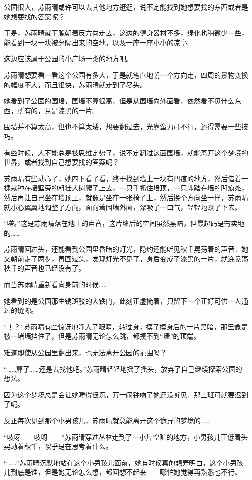 公园很大，苏雨晴或许可以去其他地方逛逛，说不定能找到她想要找的东西或者是她想要找的答案呢？

于是，苏雨晴就干脆朝着反方向走去，这边的健身器材不多，绿化也稍微少一些，能看到一块一块被分隔出来的空地，以及一座一座小小的凉亭。

这边应该属于公园的小广场一类的地方吧。

苏雨晴想要看一看这个公园有多大，于是就笔直地朝一个方向走，四周的景物变换的幅度不大，而且很快，苏雨晴就走到了尽头。

她看到了公园的围墙，围墙不算很高，但是从围墙向外面看，依然看不见什么东西，所有的，只是漆黑的一片。

围墙并不算太高，但也不算太矮，想要翻过去，光靠蛮力可不行，还得需要一些技巧。

有些时候，人不能总是被思维定势了，说不定翻过这面围墙，就能离开这个梦境的世界，或者找到自己想要找的答案呢？

苏雨晴有些动心了，她四下看了看，终于找到墙上一块有凹痕的地方，然后借着一棵栽种在墙壁旁的粗壮大树爬了上去，一只手抓住墙顶，一只脚踏在墙的凹痕处，然后再让自己坐在墙顶上，就像是坐在一张椅子上，然后换个方向坐一样，苏雨晴就小心翼翼地调整了方向，面向着围墙外面，深吸了一口气，轻轻地跃了下去。

“嗒。”这是苏雨晴落在地上的声音，这片墙后的空间虽然黑暗，但最起码是有实地的……

苏雨晴回过头，还能看到公园里昏暗的灯光，隐约还能听见秋千晃荡着的声音，她又朝前走了两步，再回过头，发现灯光不见了，身后变成了漆黑的一片，就连晃荡秋千的声音也已经没有了。

而当苏雨晴重新看向身前的时候……

她看到的是公园那生锈斑驳的大铁门，此刻正虚掩着，只留下一个正好可供一人通过的缝隙。

“！？”苏雨晴有些惊讶地睁大了眼睛，转过身，摸了摸身后的一片黑暗，那里像是被一堵墙挡住了，但是苏雨晴无论怎么跳，都摸不到“墙”的顶端。

难道即使从公园里翻出来，也无法离开公园的范围吗？

“……算了……还是去找他吧。”苏雨晴轻轻地摇了摇头，放弃了自己继续探索公园的想法。

因为这个梦境总是会让她睡得很沉，万一闹钟响了她还没听见，那上班可就要迟到了呢。

反正每次见到那个小男孩儿，苏雨晴就总能离开这个诡异的梦境的……

“吱呀——吱呀——”苏雨晴穿过丛林走到了一小片空旷的地方，小男孩儿正低着头晃动着秋千，似乎是在思考着什么。

“……”苏雨晴沉默地站在这个小男孩儿面前，她有时候真的想弄明白，这个小男孩儿到底是谁，但是她无论怎么想，都回想不起来——哪怕她觉得再熟悉也不行。

